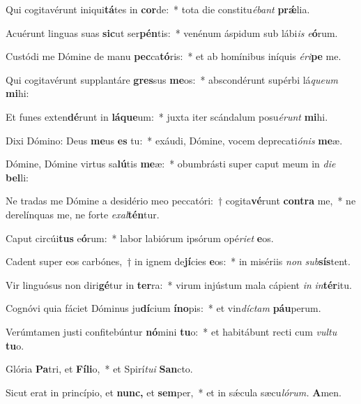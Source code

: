 \item Qui cogitavérunt iniqui\textbf{tá}tes in \textbf{cor}de:~* tota die constitu\tinyhspace\textit{ébant} \textbf{prǽ}lia.
\item Acuérunt linguas suas \textbf{sic}ut ser\textbf{pén}tis:~* venénum áspidum sub lábi\textit{is} \textit{e}\textbf{ó}rum.
\item Custódi me Dómine de manu \textbf{pec}ca\textbf{tó}ris:~* et ab homínibus iníquis \textit{éri}\textbf{pe} me.
\item Qui cogitavérunt supplantáre \textbf{gres}sus \textbf{me}os:~* abscondérunt supérbi lá\tinyhspace\textit{queum} \textbf{mi}hi:
\item Et funes exten\textbf{dé}runt in \textbf{lá}\textbf{que}um:~* juxta iter scándalum posu\tinyhspace\textit{érunt} \textbf{mi}hi.
\item Dixi Dómino: Deus \textbf{me}us \textbf{es} tu:~* exáudi, Dómine, vocem deprecati\textit{ónis} \textbf{me}æ.
\item Dómine, Dómine virtus sa\textbf{lú}tis \textbf{me}æ:~* obumbrásti super caput meum in \textit{die} \textbf{bel}li:
\item Ne tradas me Dómine a desidério meo peccatóri:~† cogita\textbf{vé}runt \textbf{con}\textbf{tra} me,~* ne derelínquas me, ne forte \textit{exal}\textbf{tén}tur.
\item Caput circúi\textbf{tus} e\textbf{ó}rum:~* labor labiórum ipsórum opé\textit{riet} \textbf{e}os.
\item Cadent super eos carbónes,~† in ignem de\textbf{jí}cies \textbf{e}os:~* in misériis \textit{non} \textit{sub}\textbf{sís}tent.
\item Vir linguósus non diri\textbf{gé}tur in \textbf{ter}ra:~* virum injústum mala cápient \textit{in} \textit{in}\textbf{tér}itu.
\item Cognóvi quia fáciet Dóminus ju\textbf{dí}cium \textbf{ín}\textbf{o}pis:~* et vin\textit{díctam} \textbf{páu}perum.
\item Verúmtamen justi confitebúntur \textbf{nó}mini \textbf{tu}o:~* et habitábunt recti cum \textit{vultu} \textbf{tu}o.
\item Glória \textbf{Pa}tri, et \textbf{Fí}\textbf{li}o,~* et Spirí\tinyhspace\textit{tui} \textbf{San}cto.
\item Sicut erat in princípio, et \textbf{nunc,} et \textbf{sem}per,~* et in sǽcula sæcu\tinyhspace\textit{lórum.} \textbf{A}men.